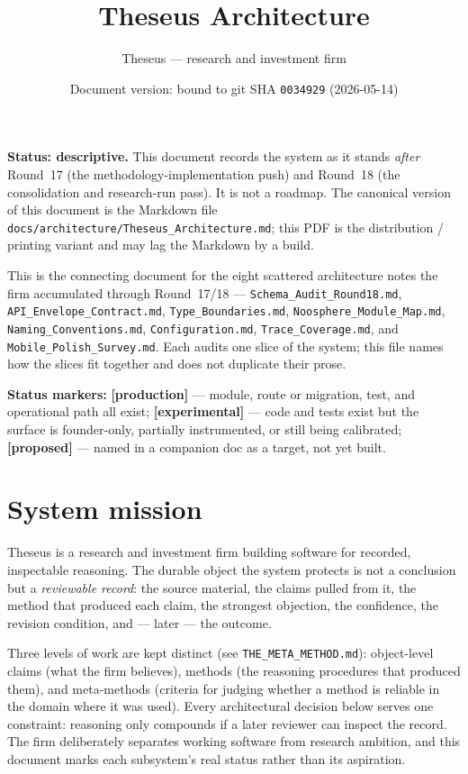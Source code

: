 \documentclass[11pt]{article}
\title{Theseus Architecture}
\author{Theseus --- research and investment firm}
\date{Document version: bound to git SHA \texttt{0034929} (2026-05-14)}
\begin{document}
\maketitle

\noindent\textbf{Status: descriptive.} This document records the system as it
stands \emph{after} Round~17 (the methodology-implementation push) and
Round~18 (the consolidation and research-run pass). It is not a roadmap. The
canonical version of this document is the Markdown file
\texttt{docs/architecture/Theseus\_Architecture.md}; this PDF is the
distribution / printing variant and may lag the Markdown by a build.

\medskip
\noindent This is the connecting document for the eight scattered architecture
notes the firm accumulated through Round~17/18 ---
\texttt{Schema\_Audit\_Round18.md}, \texttt{API\_Envelope\_Contract.md},
\texttt{Type\_Boundaries.md}, \texttt{Noosphere\_Module\_Map.md},
\texttt{Naming\_Conventions.md}, \texttt{Configuration.md},
\texttt{Trace\_Coverage.md}, and \texttt{Mobile\_Polish\_Survey.md}. Each
audits one slice of the system; this file names how the slices fit together
and does not duplicate their prose.

\medskip
\noindent\textbf{Status markers:} \textbf{[production]} --- module, route or
migration, test, and operational path all exist; \textbf{[experimental]} ---
code and tests exist but the surface is founder-only, partially instrumented,
or still being calibrated; \textbf{[proposed]} --- named in a companion doc as
a target, not yet built.

\section{System mission}

Theseus is a research and investment firm building software for recorded,
inspectable reasoning. The durable object the system protects is not a
conclusion but a \emph{reviewable record}: the source material, the claims
pulled from it, the method that produced each claim, the strongest objection,
the confidence, the revision condition, and --- later --- the outcome.

Three levels of work are kept distinct (see \texttt{THE\_META\_METHOD.md}):
object-level claims (what the firm believes), methods (the reasoning
procedures that produced them), and meta-methods (criteria for judging whether
a method is reliable in the domain where it was used). Every architectural
decision below serves one constraint: reasoning only compounds if a later
reviewer can inspect the record. The firm deliberately separates working
software from research ambition, and this document marks each subsystem's real
status rather than its aspiration.
\end{document}
